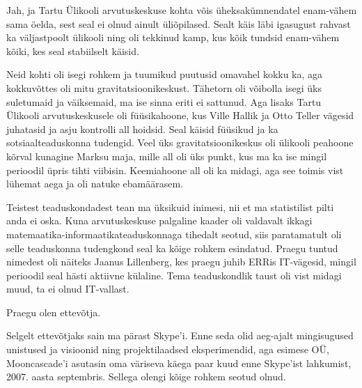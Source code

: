 Jah, ja Tartu Ülikooli arvutuskeskuse kohta võis üheksakümnendatel 
enam-vähem sama öelda, sest seal ei olnud ainult üliõpilased. Sealt 
käis läbi igasugust rahvast ka väljastpoolt ülikooli ning oli tekkinud 
kamp, kus kõik tundsid enam-vähem kõiki, kes seal stabiilselt käisid. 


Neid kohti oli isegi rohkem ja tuumikud puutusid omavahel 
kokku ka, aga kokkuvõttes oli mitu gravitatsioonikeskust. Tähetorn oli 
võibolla isegi üks suletumaid ja väiksemaid, ma ise sinna
eriti ei sattunud. Aga lisaks Tartu Ülikooli 
arvutuskeskusele oli 
füüsikahoone, kus Ville 
Hallik ja Otto Teller 
vägesid juhatasid ja asju kontrolli all hoidsid. Seal käisid
füüsikud ja ka sotsiaalteaduskonna 
tudengid. Veel üks
gravitatsioonikeskus oli ülikooli peahoone kõrval kunagine Marksu 
maja, mille all oli üks punkt, kus ma ka
ise mingil perioodil üpris tihti viibisin. Keemiahoone all oli ka midagi, aga see toimis vist lühemat aega ja
oli natuke ebamäärasem. 


Teistest teaduskondadest tean ma üksikuid inimesi, nii et ma
statistilist pilti anda ei oska. Kuna arvutuskeskuse 
palgaline kaader oli valdavalt ikkagi 
matemaatika-informaatikateaduskonnaga tihedalt seotud, siis paratamatult oli 
selle teaduskonna tudengkond seal ka kõige rohkem esindatud. 
Praegu tuntud nimedest oli näiteks Jaanus Lillenberg, kes praegu juhib ERRis IT-vägesid, mingil perioodil seal hästi 
aktiivne külaline. Tema teaduskondlik taust oli vist
midagi muud, ta ei olnud IT-vallast. 

Praegu olen ettevõtja. 


Selgelt ettevõtjaks sain ma pärast Skype'i. Enne 
seda olid aeg-ajalt mingisugused unistused ja visioonid ning
projektilaadsed eksperimendid, aga esimese OÜ, Mooncascade'i asutasin oma väriseva 
käega paar kuud enne Skype'ist lahkumist, 2007. aasta septembris. 
Sellega olengi kõige rohkem seotud olnud. 

